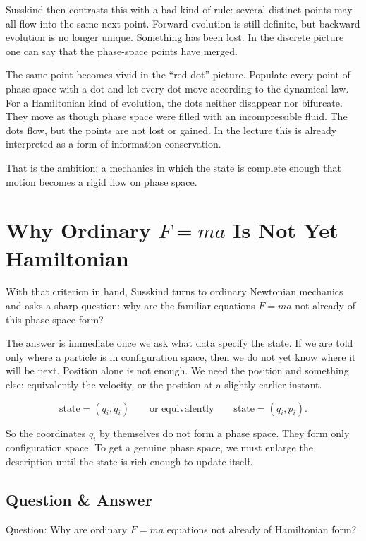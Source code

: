 Susskind then contrasts this with a bad kind of rule: several distinct points may all flow into the same next point. Forward evolution is still definite, but backward evolution is no longer unique. Something has been lost. In the discrete picture one can say that the phase-space points have merged.

The same point becomes vivid in the ``red-dot'' picture. Populate every point of phase space with a dot and let every dot move according to the dynamical law. For a Hamiltonian kind of evolution, the dots neither disappear nor bifurcate. They move as though phase space were filled with an incompressible fluid. The dots flow, but the points are not lost or gained. In the lecture this is already interpreted as a form of information conservation.

That is the ambition: a mechanics in which the state is complete enough that motion becomes a rigid flow on phase space.

\section{Why Ordinary \texorpdfstring{$F=ma$}{F=ma} Is Not Yet Hamiltonian}

With that criterion in hand, Susskind turns to ordinary Newtonian mechanics and asks a sharp question: why are the familiar equations \(F=ma\) not already of this phase-space form?

The answer is immediate once we ask what data specify the state. If we are told only where a particle is in configuration space, then we do not yet know where it will be next. Position alone is not enough. We need the position and something else: equivalently the velocity, or the position at a slightly earlier instant.

\begin{equation}
\text{state}=(q_i,\dot q_i)
\qquad \text{or equivalently} \qquad
\text{state}=(q_i,p_i).
\end{equation}

So the coordinates \(q_i\) by themselves do not form a phase space. They form only configuration space. To get a genuine phase space, we must enlarge the description until the state is rich enough to update itself.

\subsection{Question \& Answer}

Question: Why are ordinary \(F=ma\) equations not already of Hamiltonian form?

